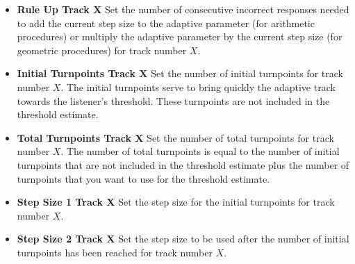 \documentclass[a4paper,12pt,english]{sphinxmanual}
\begin{document}
\begin{itemize}
\item {} 
\textbf{Rule Up Track X} Set the number of consecutive incorrect responses
needed to add the current step size to the adaptive parameter (for
arithmetic procedures) or multiply the adaptive parameter by the
current step size (for geometric procedures) for track number
$X$.

\item {} 
\textbf{Initial Turnpoints Track X} Set the number of initial turnpoints
for track number $X$. The initial turnpoints serve to bring
quickly the adaptive track towards the listener’s threshold. These
turnpoints are not included in the threshold estimate.

\item {} 
\textbf{Total Turnpoints Track X} Set the number of total turnpoints for
track number $X$. The number of total turnpoints is equal to
the number of initial turnpoints that are not included in the
threshold estimate plus the number of turnpoints that you want to use
for the threshold estimate.

\item {} 
\textbf{Step Size 1 Track X} Set the step size for the initial turnpoints
for track number $X$.

\item {} 
\textbf{Step Size 2 Track X} Set the step size to be used after the number
of initial turnpoints has been reached for track number $X$.

\end{itemize}
\end{document}
